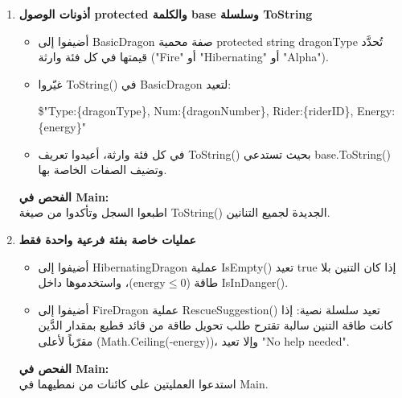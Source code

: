 \documentclass[14pt]{extarticle}
\begin{document}
\begin{enumerate}[label=\textbf{تمرين \arabic*:}, wide=0pt, leftmargin=*, itemsep=2.2em]
    \item \textbf{أذونات الوصول \textenglish{protected} والكلمة \textenglish{base} وسلسلة \textenglish{ToString}}
    \begin{itemize}
        \item أضيفوا إلى \textenglish{BasicDragon} صفة محمية \textenglish{protected string dragonType} تُحدَّد قيمتها في كل فئة وارثة (\textenglish{"Fire"} أو \textenglish{"Hibernating"} أو \textenglish{"Alpha"}).
        \item غيّروا \textenglish{ToString()} في \textenglish{BasicDragon} لتعيد:
        \begin{center}
        \textenglish{\$"Type:\{dragonType\}, Num:\{dragonNumber\}, Rider:\{riderID\}, Energy:\{energy\}"}
        \end{center}
        \item في كل فئة وارثة، أعيدوا تعريف \textenglish{ToString()} بحيث تستدعي \textenglish{base.ToString()} وتضيف الصفات الخاصة بها.
    \end{itemize}
    \textbf{الفحص في \textenglish{Main}:} \\
    اطبعوا السجل وتأكدوا من صيغة \textenglish{ToString()} الجديدة لجميع التنانين.

\clearpage

    \item \textbf{عمليات خاصة بفئة فرعية واحدة فقط}
    \begin{itemize}
        \item أضيفوا إلى \textenglish{HibernatingDragon} عملية \textenglish{IsEmpty()} تعيد \textenglish{true} إذا كان التنين بلا طاقة ($\text{energy} \le 0$)، واستخدموها داخل \textenglish{IsInDanger()}.
        \item أضيفوا إلى \textenglish{FireDragon} عملية \textenglish{RescueSuggestion()} تعيد سلسلة نصية: إذا كانت طاقة التنين سالبة تقترح طلب تحويل طاقة من قائد قطيع بمقدار الدَّين مقرّباً لأعلى (\textenglish{Math.Ceiling(-energy)})، وإلا تعيد \textenglish{"No help needed"}.
    \end{itemize}
    \textbf{الفحص في \textenglish{Main}:} \\
    استدعوا العمليتين على كائنات من نمطيهما في \textenglish{Main}.


\end{enumerate}
\end{document}
